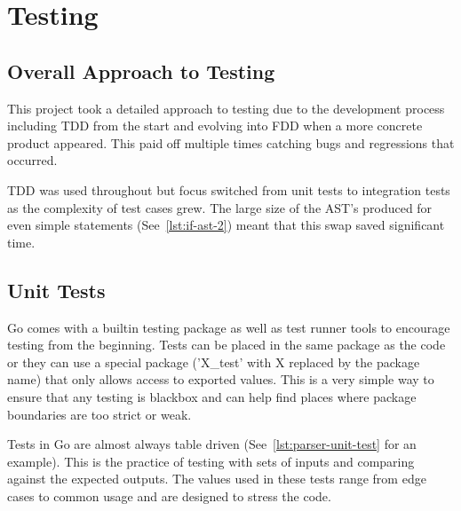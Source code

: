 \chapter{Testing}




\section{Overall Approach to Testing}
This project took a detailed approach to testing due to the development process including TDD from the start and evolving into FDD when a more concrete product appeared.
This paid off multiple times catching bugs and regressions that occurred.

TDD was used throughout but focus switched from unit tests to integration tests as the complexity of test cases grew. 
The large size of the AST's produced for even simple statements (See~\ref{lst:if-ast-2}) meant that this swap saved significant time.

\section{Unit Tests}
Go comes with a builtin testing package as well as test runner tools to encourage testing from the beginning.
Tests can be placed in the same package as the code or they can use a special package ('X\_test' with X replaced by the package name) that only allows access to exported values.
This is a very simple way to ensure that any testing is blackbox and can help find places where package boundaries are too strict or weak.

Tests in Go are almost always table driven (See~\ref{lst:parser-unit-test} for an example).
This is the practice of testing with sets of inputs and comparing against the expected outputs.
The values used in these tests range from edge cases to common usage and are designed to stress the code.


